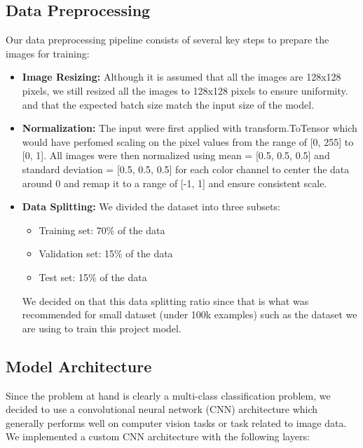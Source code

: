 \documentclass[10pt]{article}
\begin{document}
\subsection{Data Preprocessing}

Our data preprocessing pipeline consists of several key steps to prepare the images for training:

\begin{itemize}
    \item \textbf{Image Resizing:} Although it is assumed that all the images are 128x128 pixels, we still resized all the images to 128x128 pixels to ensure uniformity.
    and that the expected batch size match the input size of the model.
    
    \item \textbf{Normalization:} The input were first applied with transform.ToTensor which would have perfomed scaling on the pixel values from the range of [0, 255] to [0, 1]. 
    All images were then normalized using mean = [0.5, 0.5, 0.5] and standard deviation = [0.5, 0.5, 0.5] for each color channel to center the data around 0 and remap it to a range of 
    [-1, 1] and ensure consistent scale.
    
    \item \textbf{Data Splitting:} We divided the dataset into three subsets:
    \begin{itemize}
        \item Training set: 70\% of the data
        \item Validation set: 15\% of the data
        \item Test set: 15\% of the data
    \end{itemize}
    We decided on that this data splitting ratio since that is what was recommended for small dataset (under 100k examples) such as the dataset we are using to train this project model.
\end{itemize}

\subsection{Model Architecture}

Since the problem at hand is clearly a multi-class classification problem, we decided to use a convolutional neural network (CNN) architecture which generally performs well on computer vision tasks
or task related to image data. We implemented a custom CNN architecture with the following layers:
\end{document}
